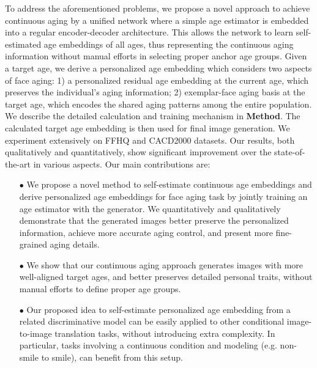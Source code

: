 \documentclass[final]{cvpr}
\begin{document}
To address the aforementioned problems, we propose a novel approach to achieve continuous aging by a unified network where a simple age estimator is embedded into a regular encoder-decoder architecture.
This allows the network to learn self-estimated age embeddings of all ages, thus representing the continuous aging information without manual efforts in selecting proper anchor age groups.
Given a target age, we derive a personalized age embedding which considers two aspects of face aging: 1) a personalized residual age embedding at the current age, which preserves the individual's aging information; 2) exemplar-face aging basis at the target age, which encodes the shared aging patterns among the entire population. We describe the detailed calculation and training mechanism in \textbf{Method}. The calculated target age embedding is then used for final image generation. We experiment extensively on FFHQ \cite{ karras2019style} and CACD2000 \cite{chen2014cross} datasets. Our results, both qualitatively and quantitatively, show significant improvement over the state-of-the-art in various aspects. 
Our main contributions are:
\begin{itemize}
\item[$\bullet$] We propose a novel method to self-estimate continuous age embeddings and derive personalized age embeddings for face aging task by jointly training an age estimator with the generator. We quantitatively and qualitatively demonstrate that the generated images better preserve the personalized information, achieve more accurate aging control, and present more fine-grained aging details.
\item[$\bullet$] We show that our continuous aging approach generates images with more well-aligned target ages, and better preserves detailed personal traits, without manual efforts to define proper age groups.
\item[$\bullet$] Our proposed idea to self-estimate personalized age embedding from a related discriminative model can be easily applied to other conditional image-to-image translation tasks, without introducing extra complexity. In particular, tasks involving a continuous condition and modeling (e.g. non-smile to smile), can benefit from this setup.
\end{itemize}
\end{document}
